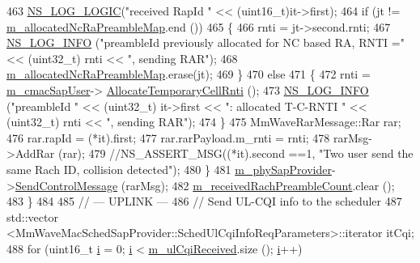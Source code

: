 \begin{DoxyCode}
463                         \hyperlink{group__logging_ga88acd260151caf2db9c0fc84997f45ce}{NS\_LOG\_LOGIC}(\textcolor{stringliteral}{"received RapId "} << (uint16\_t)it->first);
464                         \textcolor{keywordflow}{if} (jt != \hyperlink{classns3_1_1MmWaveEnbMac_a3138c3896ca19151f6a08008669e07da}{m\_allocatedNcRaPreambleMap}.end ())
465                         \{
466                           rnti = jt->second.rnti;
467                           \hyperlink{group__logging_gafbd73ee2cf9f26b319f49086d8e860fb}{NS\_LOG\_INFO} (\textcolor{stringliteral}{"preambleId previously allocated for NC based RA, RNTI ="}
       << (uint32\_t) rnti << \textcolor{stringliteral}{", sending RAR"});
468                           \hyperlink{classns3_1_1MmWaveEnbMac_a3138c3896ca19151f6a08008669e07da}{m\_allocatedNcRaPreambleMap}.erase(jt);
469                         \}
470                         \textcolor{keywordflow}{else}
471                         \{
472                           rnti = \hyperlink{classns3_1_1MmWaveEnbMac_ae4cb1289b73c49375271e651829be86c}{m\_cmacSapUser}->
      \hyperlink{classns3_1_1LteEnbCmacSapUser_af022be8bca9d5d9969d9aced42a8793d}{AllocateTemporaryCellRnti} ();
473                           \hyperlink{group__logging_gafbd73ee2cf9f26b319f49086d8e860fb}{NS\_LOG\_INFO} (\textcolor{stringliteral}{"preambleId "} << (uint32\_t) it->first << \textcolor{stringliteral}{": allocated
       T-C-RNTI "} << (uint32\_t) rnti << \textcolor{stringliteral}{", sending RAR"});
474                         \}
475                         MmWaveRarMessage::Rar rar;
476                         rar.rapId = (*it).first;
477                         rar.rarPayload.m\_rnti = rnti;
478                         rarMsg->AddRar (rar);
479                         \textcolor{comment}{//NS\_ASSERT\_MSG((*it).second ==1, "Two user send the same Rach ID, collision
       detected");}
480                 \}
481                 \hyperlink{classns3_1_1MmWaveEnbMac_a0bfb3ea8d3d00e3c92ac3a554602d40b}{m\_phySapProvider}->\hyperlink{classns3_1_1MmWavePhySapProvider_a976b307eb8571c45503e119cefd512cc}{SendControlMessage} (rarMsg);
482                 \hyperlink{classns3_1_1MmWaveEnbMac_a2ef0d45938569968890f005676fcdf95}{m\_receivedRachPreambleCount}.clear ();
483         \}
484 
485         \textcolor{comment}{// --- UPLINK ---}
486         \textcolor{comment}{// Send UL-CQI info to the scheduler}
487         std::vector <MmWaveMacSchedSapProvider::SchedUlCqiInfoReqParameters>::iterator itCqi;
488         \textcolor{keywordflow}{for} (uint16\_t \hyperlink{bernuolliDistribution_8m_a6f6ccfcf58b31cb6412107d9d5281426}{i} = 0; \hyperlink{bernuolliDistribution_8m_a6f6ccfcf58b31cb6412107d9d5281426}{i} < \hyperlink{classns3_1_1MmWaveEnbMac_aaea2d5b20bbd7a5827bebd0c6b782e7c}{m\_ulCqiReceived}.size (); \hyperlink{bernuolliDistribution_8m_a6f6ccfcf58b31cb6412107d9d5281426}{i}++)

\end{DoxyCode}
